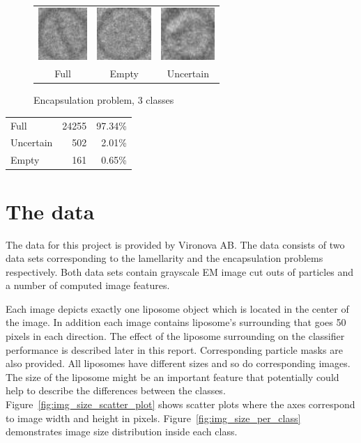 \documentclass[a4paper, 11pt, table]{article}
\begin{document}
\begin{figure}[H]
\centering
\begin{tabular}{ccc}
	\includegraphics[height=2cm, keepaspectratio]{problem_description/packiging/full} & \includegraphics[height=2cm, keepaspectratio]{problem_description/packiging/empty} & \includegraphics[height=2cm, keepaspectratio]{problem_description/packiging/uncertain} \\
	Full & Empty & Uncertain \\[6pt]
\end{tabular}
\caption{Encapsulation problem, 3 classes}
\label{fig:encapsulation_problem}
\end{figure}


\begin{center}
\label{table:encapsulation_dataset}
\begin{tabular}{lrr}
\toprule
Full & \num{24255} & 97.34\% \\ 
Uncertain & \num{502} & 2.01\% \\ 
Empty & \num{161} & 0.65\% \\ 
\end{tabular} 
\end{center}

\section{The data}
\label{sec:dataset}
The data for this project is provided by Vironova AB. The data consists of two data sets corresponding to the lamellarity and the encapsulation problems respectively. Both data sets contain grayscale EM image cut outs of particles and a number of computed image features.

Each image depicts exactly one liposome object which is located in the center of the image. In addition each image contains liposome's surrounding that goes 50 pixels in each direction. The effect of the liposome surrounding on the classifier performance is described later in this report. Corresponding particle masks are also provided. All liposomes have different sizes and so do corresponding images. The size of the liposome might be an important feature that potentially could help to describe the differences between the classes.  Figure~\ref{fig:img_size_scatter_plot} shows scatter plots where the axes correspond to image width and height in pixels. Figure~\ref{fig:img_size_per_class} demonstrates image size distribution inside each class.
\end{document}
